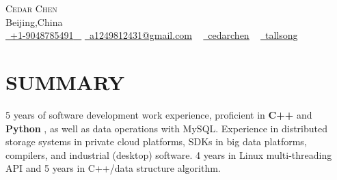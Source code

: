 \documentclass[a4paper,20pt]{article}
\newcommand{\resumeSubHeadingListStart}{\begin{itemize}[leftmargin=0.0in, label={}]}
\newcommand{\resumeSubHeadingListEnd}{\end{itemize}}
\begin{document}
\vfill


\begin{center}
    {\Huge \scshape Cedar Chen}  \href{https://tallsong.github.io/}{\raisebox{0.7\height}\faExternalLink }     \\ \vspace{1pt}
    Beijing,China \\ \vspace{1pt}
    \small \href{tel:+19048785401}{ \raisebox{-0.1\height}\faPhone\ \underline{+1-9048785491} ~} \href{mailto:a1249812431@gmail.com}{\raisebox{-0.2\height}\faEnvelope\  \underline{a1249812431@gmail.com}} ~ 
    \href{https://linkedin.com/in/cedarchen}{\raisebox{-0.2\height}\faLinkedinSquare\ \underline{cedarchen}}  ~
    \href{https://github.com/tallsong}{\raisebox{-0.2\height}\faGithub\ \underline{tallsong}} ~    
    \vspace{-8pt}
\end{center}





\section{SUMMARY}
5 years of software development work experience, proficient in \textbf{C++} and \textbf{Python} , as well as data operations with MySQL. Experience in distributed storage systems in private cloud platforms, SDKs in big data platforms, compilers, and industrial (desktop) software. 4 years in Linux  multi-threading API and 5 years in C++/data structure algorithm.
        \vspace*{2.0\multicolsep}

\vspace{10pt}
\vspace{-12pt}
\end{document}
